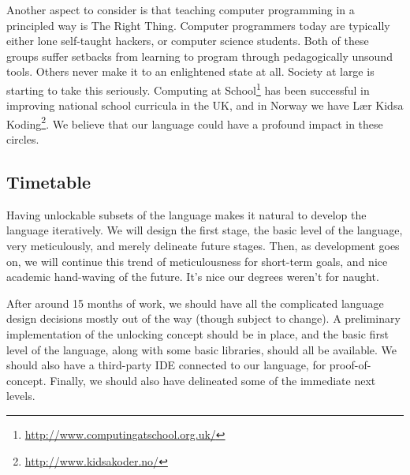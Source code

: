 Another aspect to consider is that teaching computer programming in a 
principled way is The Right Thing. Computer programmers today are typically 
either lone self-taught hackers, or computer science students. Both of these 
groups suffer setbacks from learning to program through pedagogically unsound 
tools. Others never make it to an enlightened state at all. Society at large 
is starting to take this seriously. Computing at 
School\footnote{\url{http://www.computingatschool.org.uk/}} has been 
successful in improving national school curricula in the UK, and in Norway we 
have Lær Kidsa Koding\footnote{\url{http://www.kidsakoder.no/}}. We believe
that our language could have a profound impact in these circles.

\subsection{Timetable}
Having unlockable subsets of the language makes it natural to develop the 
language iteratively. We will design the first stage, the basic level of the 
language, very meticulously, and merely delineate future stages. Then, as 
development goes on, we will continue this trend of meticulousness for 
short-term goals, and nice academic hand-waving of the future. It's nice our 
degrees weren't for naught.

After around 15 months of work, we should have all the complicated language 
design decisions mostly out of the way (though subject to change). A 
preliminary implementation of the unlocking concept should be in place, and 
the basic first level of the language, along with some basic libraries, should 
all be available. We should also have a third-party IDE connected to our 
language, for proof-of-concept. Finally, we should also have delineated some 
of the immediate next levels.
